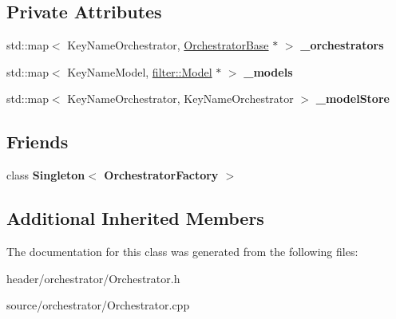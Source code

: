 \subsection*{Private Attributes}
\begin{DoxyCompactItemize}
\item 
\mbox{\label{classorchestrator_1_1_orchestrator_factory_a166fc3741c9014ec5d6828b8b5db50c6}} 
std\+::map$<$ Key\+Name\+Orchestrator, \hyperlink{classorchestrator_1_1_orchestrator_base}{Orchestrator\+Base} $\ast$ $>$ {\bfseries \+\_\+orchestrators}
\item 
\mbox{\label{classorchestrator_1_1_orchestrator_factory_a5709b7d0210fd774303b5083a6a25388}} 
std\+::map$<$ Key\+Name\+Model, \hyperlink{classfilter_1_1_model}{filter\+::\+Model} $\ast$ $>$ {\bfseries \+\_\+models}
\item 
\mbox{\label{classorchestrator_1_1_orchestrator_factory_a2ab1ce6ab0029cd0059a57c0796a615c}} 
std\+::map$<$ Key\+Name\+Orchestrator, Key\+Name\+Orchestrator $>$ {\bfseries \+\_\+model\+Store}
\end{DoxyCompactItemize}
\subsection*{Friends}
\begin{DoxyCompactItemize}
\item 
\mbox{\label{classorchestrator_1_1_orchestrator_factory_a2b3bb23968c4533e8f0a294aab1a48b4}} 
class {\bfseries Singleton$<$ Orchestrator\+Factory $>$}
\end{DoxyCompactItemize}
\subsection*{Additional Inherited Members}


The documentation for this class was generated from the following files\+:\begin{DoxyCompactItemize}
\item 
header/orchestrator/Orchestrator.\+h\item 
source/orchestrator/Orchestrator.\+cpp\end{DoxyCompactItemize}
